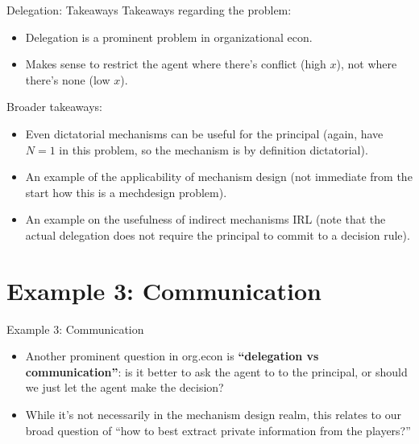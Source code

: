 \documentclass[english,10pt
,aspectratio=169
]{beamer}
\begin{document}
\begin{frame}{Delegation: Takeaways}
	Takeaways regarding the problem:
	\begin{itemize}
		\item Delegation is a prominent problem in organizational econ.
		\item Makes sense to restrict the agent where there's conflict (high $x$), not where there's none (low $x$).
	\end{itemize}

	Broader takeaways:
	\begin{itemize}
		\item Even dictatorial mechanisms can be useful for the principal (again, have $N=1$ in this problem, so the mechanism is by definition dictatorial).
		\item An example of the applicability of mechanism design (not immediate from the start how this is a mechdesign problem).
		\item An example on the usefulness of indirect mechanisms IRL (note that the actual delegation does not require the principal to commit to a decision rule).
	\end{itemize}
\end{frame}



\section{Example 3: Communication}

\begin{frame}{Example 3: Communication}
	\begin{itemize}
		\item Another prominent question in org.econ is \textbf{``delegation vs communication''}: is it better to ask the agent to  to the principal, or should we just let the agent \alert{make the decision}?
		
		\item While it's not necessarily in the mechanism design realm, this relates to our broad question of ``how to best extract private information from the players?''
	\end{itemize}
\end{frame}
\end{document}
